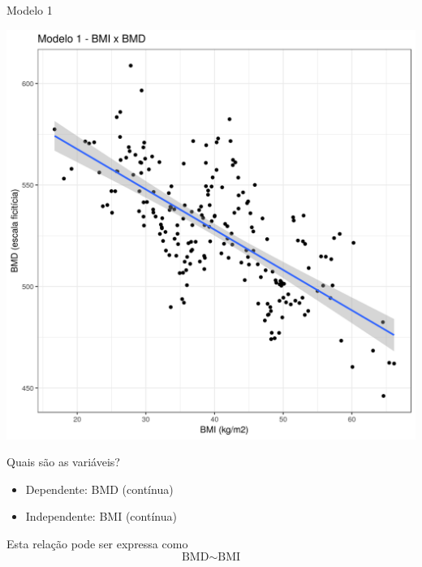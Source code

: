 \documentclass{beamer}
\begin{document}
\begin{frame}{\scriptsize Modelo 1}
  \begin{center}
    \includegraphics[height=.9\textheight]{Cap31-32/pratica-rlm1}
  \end{center}
\end{frame}

\begin{frame}{\scriptsize Quais são as variáveis?}
  \begin{itemize}
  \item Dependente: BMD (contínua)
  \item Independente: BMI (contínua)
  \end{itemize}
  \vfill
  \begin{block}{Esta relação pode ser expressa como}
    \footnotesize
    \begin{displaymath}
      \text{BMD} \sim \text{BMI}
    \end{displaymath}
  \end{block}
\end{frame}
\end{document}
